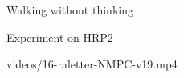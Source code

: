 
\begin{frame}{Walking without thinking}

\begin{center}
  \hspace*{-1cm}
  \scalebox{0.7}{}
\end{center}

\end{frame}


\begin{frame}{Experiment on HRP2}
  \begin{center}
    {videos/16-raletter-NMPC-v19.mp4}
  \end{center}
\end{frame}


